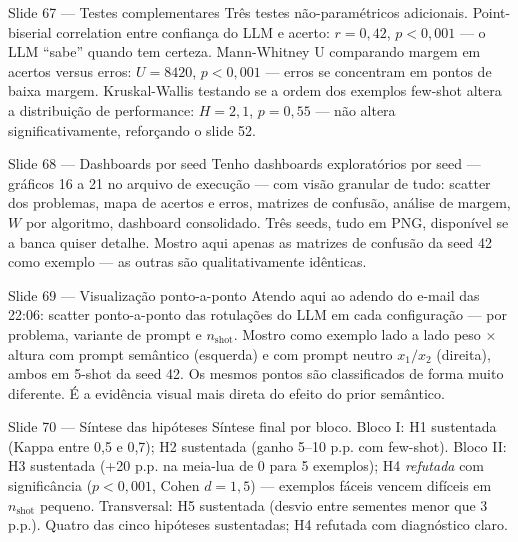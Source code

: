 \documentclass[aspectratio=169,10pt]{beamer}
\begin{document}
\begin{frame}{Slide 67 --- Testes complementares}
\footnotesize
Tr\^es testes n\~ao-param\'etricos adicionais. Point-biserial correlation entre confian\c{c}a do LLM e acerto: $r = 0,42$, $p < 0,001$ --- o LLM ``sabe'' quando tem certeza. Mann-Whitney U comparando margem em acertos versus erros: $U = 8420$, $p < 0,001$ --- erros se concentram em pontos de baixa margem. Kruskal-Wallis testando se a ordem dos exemplos few-shot altera a distribui\c{c}\~ao de performance: $H = 2,1$, $p = 0,55$ --- n\~ao altera significativamente, refor\c{c}ando o slide 52.
\end{frame}

\begin{frame}{Slide 68 --- Dashboards por seed}
\footnotesize
Tenho dashboards explorat\'orios por seed --- gr\'aficos 16 a 21 no arquivo de execu\c{c}\~ao --- com vis\~ao granular de tudo: scatter dos problemas, mapa de acertos e erros, matrizes de confus\~ao, an\'alise de margem, $W$ por algoritmo, dashboard consolidado. Tr\^es seeds, tudo em PNG, dispon\'ivel se a banca quiser detalhe. Mostro aqui apenas as matrizes de confus\~ao da seed 42 como exemplo --- as outras s\~ao qualitativamente id\^enticas.
\end{frame}

\begin{frame}{Slide 69 --- Visualiza\c{c}\~ao ponto-a-ponto}
\footnotesize
Atendo aqui ao adendo do e-mail das 22:06: scatter ponto-a-ponto das rotula\c{c}\~oes do LLM em cada configura\c{c}\~ao --- por problema, variante de prompt e $n_{\text{shot}}$. Mostro como exemplo lado a lado peso $\times$ altura com prompt sem\^antico (esquerda) e com prompt neutro $x_1/x_2$ (direita), ambos em 5-shot da seed 42. Os mesmos pontos s\~ao classificados de forma muito diferente. \'E a evid\^encia visual mais direta do efeito do prior sem\^antico.
\end{frame}

\begin{frame}{Slide 70 --- S\'intese das hip\'oteses}
\footnotesize
S\'intese final por bloco. Bloco I: H1 sustentada (Kappa entre 0,5 e 0,7); H2 sustentada (ganho 5--10 p.p. com few-shot). Bloco II: H3 sustentada (+20 p.p. na meia-lua de 0 para 5 exemplos); H4 \emph{refutada} com signific\^ancia ($p < 0,001$, Cohen $d = 1,5$) --- exemplos f\'aceis vencem dif\'iceis em $n_{\text{shot}}$ pequeno. Transversal: H5 sustentada (desvio entre sementes menor que 3 p.p.). Quatro das cinco hip\'oteses sustentadas; H4 refutada com diagn\'ostico claro.
\end{frame}
\end{document}
